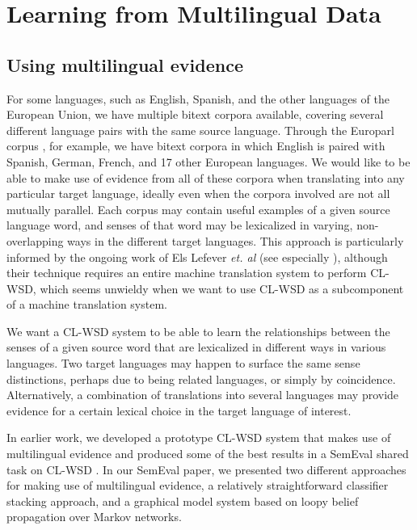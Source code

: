 \chapter{Learning from Multilingual Data}
\label{chap:multilingual}

\section{Using multilingual evidence}
For some languages, such as English, Spanish, and the other languages of the
European Union, we have multiple bitext corpora available, covering several
different language pairs with the same source language. Through the Europarl
corpus \cite{europarl}, for example, we have bitext corpora in which English is
paired with Spanish, German, French, and 17 other European languages.
We would like to be able to make use of evidence from all of these corpora when
translating into any particular target language, ideally even when the corpora
involved are not all mutually parallel.
Each corpus may contain useful examples of a given source language word,
and senses of that word may be lexicalized in varying, non-overlapping ways in
the different target languages.
This approach is particularly informed by the ongoing work of Els Lefever
\emph{et. al} (see especially \cite{lefever-hoste-decock:2011:ACL-HLT2011}),
although their technique requires an entire machine translation system to
perform CL-WSD, which seems unwieldy when we want to use CL-WSD as a
subcomponent of a machine translation system.

We want a CL-WSD system to be able to learn the relationships between the
senses of a given source word that are lexicalized in different ways in various
languages.
Two target languages may happen to surface the same sense distinctions, perhaps
due to being related languages, or simply by coincidence.
Alternatively, a combination of translations into several languages may provide
evidence for a certain lexical choice in the target language of interest.

In earlier work, we developed a prototype CL-WSD system that makes use of
multilingual evidence \cite{rudnick-liu-gasser:2013:SemEval-2013} and produced
some of the best results in a SemEval shared task on CL-WSD \cite{task10}.
In our SemEval paper, we presented two different approaches for making use of
multilingual evidence, a relatively straightforward classifier stacking
approach, and a graphical model system based on loopy belief propagation over
Markov networks.

